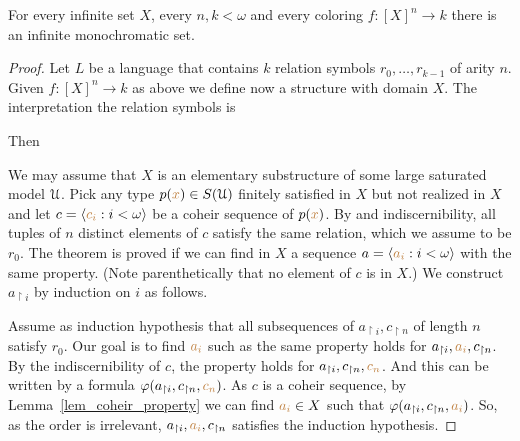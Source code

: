 \documentclass[creche.tex]{subfiles}
\begin{document}
\begin{proposition}
For every infinite set $X$, every $n,k<\omega$ and every coloring $f:[X]^n\to k$ there is an infinite monochromatic set.
\end{proposition}

\begin{proof}
Let $L$ be a language that contains $k$ relation symbols $r_0,\dots,r_{k-1}$ of arity $n$. Given $f:[X]^n\to k$ as above we define now a structure with domain $X$. The interpretation the relation symbols is




Then



We may assume that $X$ is an elementary substructure of some large saturated model $\EuScript U$. Pick any type $p({\color{brown} x})\in S(\EuScript U)$ finitely satisfied in $X$ but not realized in $X$ and let $c=\langle{\color{brown}c_i}:i<\omega\rangle$ be a coheir sequence of $p({\color{brown} x})$. By \ssf{\#} and indiscernibility, all tuples of $n$ distinct elements of $c$ satisfy the same relation, which we assume to be $r_0$. The theorem is proved if we can find in $X$ a sequence $a=\langle{\color{brown}a_i}:i<\omega\rangle$ with the same property. (Note parenthetically that no element of $c$ is in $X$.) We construct $a_{\restriction i}$ by induction on $i$ as follows. 

Assume as induction hypothesis that all subsequences of $a_{\restriction i},c_{\restriction n}$ of length $n$  
satisfy $r_0$. Our goal is to find ${\color{brown}{a_i}}$ such as the same property holds for $a_{\restriction i},{\color{brown}{a_i}},c_{\restriction n}$. By the indiscernibility of $c$, the property holds for  $a_{\restriction i},c_{\restriction n},{\color{brown}{c_n}}$.  And this can be written by a formula $\varphi(a_{\restriction i},c_{\restriction n},{\color{brown}{c_n}})$. As $c$ is a coheir sequence, by Lemma~\ref{lem_coheir_property} we can find  ${\color{brown}{a_i}}\in X$ such that  $\varphi(a_{\restriction i},c_{\restriction n},{\color{brown}{a_i}})$. So, as the order is irrelevant,  $a_{\restriction i},{\color{brown}{a_i}},c_{\restriction n}$ satisfies the induction hypothesis.
\end{proof}
\end{document}

